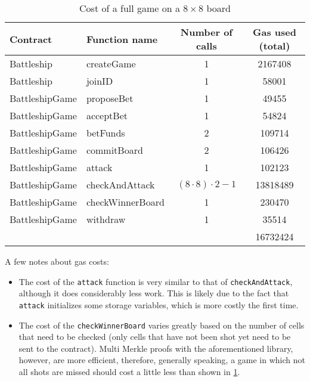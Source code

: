 \begin{table}
	\caption{Cost of a full game on a $8 \times 8$ board}
	\label{tab:full_game_gas_cost}
	\begin{center}
		\begin{tabular}[c]{llcc}\toprule
			Contract       & Function name    & Number of calls           & Gas used (total) \\\midrule
			Battleship     & createGame       & 1                         & 2167408          \\
			Battleship     & joinID           & 1                         & 58001            \\
			BattleshipGame & proposeBet       & 1                         & 49455            \\
			BattleshipGame & acceptBet        & 1                         & 54824            \\
			BattleshipGame & betFunds         & 2                         & 109714           \\
			BattleshipGame & commitBoard      & 2                         & 106426           \\
			BattleshipGame & attack           & 1                         & 102123           \\
			BattleshipGame & checkAndAttack   & $(8 \cdot 8) \cdot 2 - 1$ & 13818489         \\
			BattleshipGame & checkWinnerBoard & 1                         & 230470           \\
			BattleshipGame & withdraw         & 1                         & 35514            \\\hline
			               &                  &                           & 16732424         \\\bottomrule
		\end{tabular}
	\end{center}
\end{table}

A few notes about gas costs:
\begin{itemize}
	\item The cost of the \texttt{attack} function is very similar to that
	      of \texttt{checkAndAttack}, although it does considerably less
	      work. This is likely due to the fact that \texttt{attack}
	      initializes some storage variables, which is more costly the first time.
	\item The cost of the \texttt{checkWinnerBoard} varies greatly based on
	      the number of cells that need to be checked (only cells that have not been shot
	      yet need to be sent to the contract). Multi Merkle proofs with the
	      aforementioned library, however, are more efficient, therefore, generally
	      speaking, a game in which not all shots are missed should cost a little less
	      than shown in \cref{tab:full_game_gas_cost}.
\end{itemize}

